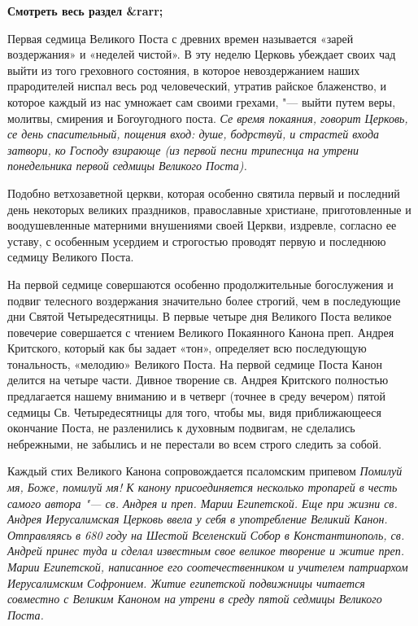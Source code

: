 




\bfseries Смотреть весь раздел &rarr;\normalfont{} 





Первая седмица Великого Поста с древних времен
называется «зарей воздержания» и «неделей
чистой». В эту неделю Церковь убеждает своих чад
выйти из того греховного состояния, в которое
невоздержанием наших прародителей ниспал весь
род человеческий, утратив райское блаженство, и
которое каждый из нас умножает сам своими
грехами, "--- выйти путем веры, молитвы, смирения и
Богоугодного поста. \itshape Се время покаяния, говорит
Церковь, се день спасительный, пощения вход: душе,
бодрствуй, и страстей входа затвори, ко Господу
взирающе\normalfont{}  (из первой песни трипеснца на
утрени понедельника первой седмицы Великого
Поста).


Подобно ветхозаветной церкви, которая особенно
святила первый и последний день некоторых
великих праздников, православные христиане,
приготовленные и воодушевленные матерними
внушениями своей Церкви, издревле, согласно ее
уставу, с особенным усердием и строгостью
проводят первую и последнюю седмицу Великого
Поста.


На первой седмице совершаются особенно
продолжительные богослужения и подвиг телесного
воздержания значительно более строгий, чем в
последующие дни Святой Четыредесятницы. В первые
четыре дня Великого Поста великое повечерие
совершается с чтением Великого Покаянного
Канона преп. Андрея Критского, который как бы
задает «тон», определяет всю последующую
тональность, «мелодию» Великого Поста. На первой
седмице Поста Канон делится на четыре части.
Дивное творение св. Андрея Критского полностью
предлагается нашему вниманию и в четверг (точнее
в среду вечером) пятой седмицы Св.
Четыредесятницы для того, чтобы мы, видя
приближающееся окончание Поста, не разленились к
духовным подвигам, не сделались небрежными, не
забылись и не перестали во всем строго следить за
собой.


Каждый стих Великого Канона сопровождается
псаломским припевом \itshape Помилуй мя, Боже, помилуй
мя!\normalfont{} К канону присоединяется несколько тропарей
в честь самого автора "--- св. Андрея и преп. Марии
Египетской. Еще при жизни св. Андрея
Иерусалимская Церковь ввела у себя в
употребление Великий Канон. Отправляясь в 680 году
на Шестой Вселенский Собор в Константинополь, св.
Андрей принес туда и сделал известным свое
великое творение и житие преп. Марии Египетской,
написанное его соотечественником и учителем
патриархом Иерусалимским Софронием. Житие
египетской подвижницы читается совместно с
Великим Каноном на утрени в среду пятой седмицы
Великого Поста.


